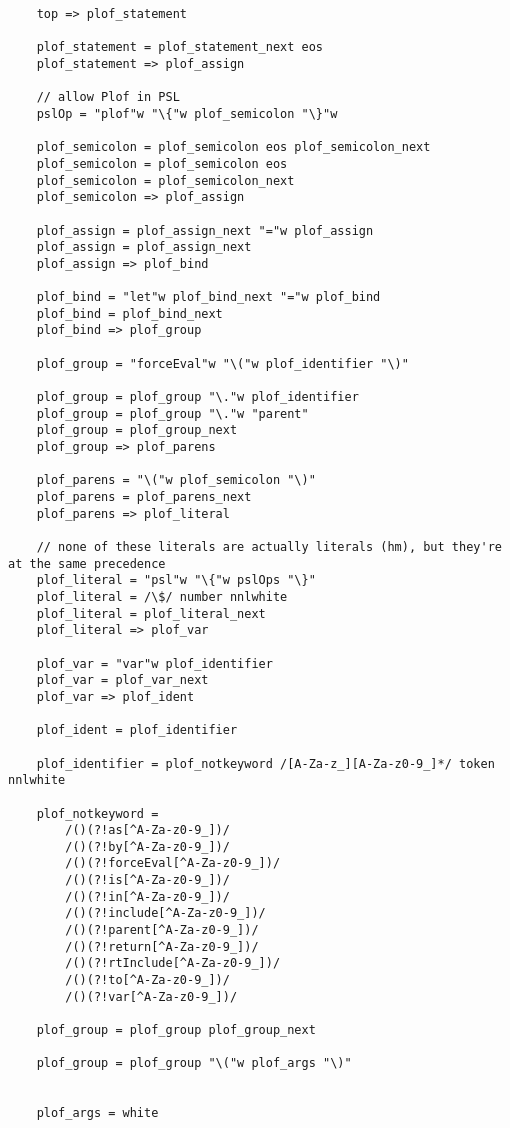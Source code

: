 \begin{verbatim}
    top => plof_statement

    plof_statement = plof_statement_next eos
    plof_statement => plof_assign

    // allow Plof in PSL
    pslOp = "plof"w "\{"w plof_semicolon "\}"w

    plof_semicolon = plof_semicolon eos plof_semicolon_next
    plof_semicolon = plof_semicolon eos
    plof_semicolon = plof_semicolon_next
    plof_semicolon => plof_assign

    plof_assign = plof_assign_next "="w plof_assign
    plof_assign = plof_assign_next
    plof_assign => plof_bind

    plof_bind = "let"w plof_bind_next "="w plof_bind
    plof_bind = plof_bind_next
    plof_bind => plof_group

    plof_group = "forceEval"w "\("w plof_identifier "\)"

    plof_group = plof_group "\."w plof_identifier
    plof_group = plof_group "\."w "parent"
    plof_group = plof_group_next
    plof_group => plof_parens

    plof_parens = "\("w plof_semicolon "\)"
    plof_parens = plof_parens_next
    plof_parens => plof_literal

    // none of these literals are actually literals (hm), but they're at the same precedence
    plof_literal = "psl"w "\{"w pslOps "\}"
    plof_literal = /\$/ number nnlwhite
    plof_literal = plof_literal_next
    plof_literal => plof_var

    plof_var = "var"w plof_identifier
    plof_var = plof_var_next
    plof_var => plof_ident

    plof_ident = plof_identifier

    plof_identifier = plof_notkeyword /[A-Za-z_][A-Za-z0-9_]*/ token nnlwhite

    plof_notkeyword =
        /()(?!as[^A-Za-z0-9_])/
        /()(?!by[^A-Za-z0-9_])/
        /()(?!forceEval[^A-Za-z0-9_])/
        /()(?!is[^A-Za-z0-9_])/
        /()(?!in[^A-Za-z0-9_])/
        /()(?!include[^A-Za-z0-9_])/
        /()(?!parent[^A-Za-z0-9_])/
        /()(?!return[^A-Za-z0-9_])/
        /()(?!rtInclude[^A-Za-z0-9_])/
        /()(?!to[^A-Za-z0-9_])/
        /()(?!var[^A-Za-z0-9_])/

    plof_group = plof_group plof_group_next

    plof_group = plof_group "\("w plof_args "\)"


    plof_args = white


\end{verbatim}
